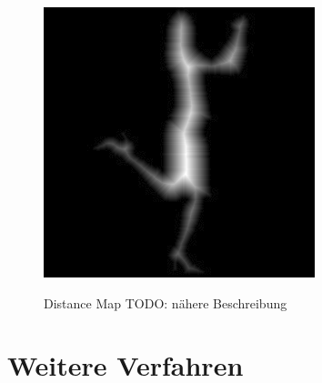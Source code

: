 \begin{figure}[h]
\begin{minipage}{5cm}
		\includegraphics[width=1.0\linewidth]{./fig/distance_map_beispiel}
		\label{fig:distance_map_beispiel}
	\end{minipage}
	\caption{Distance Map TODO: nähere Beschreibung}
\end{figure}
\section{Weitere Verfahren}
